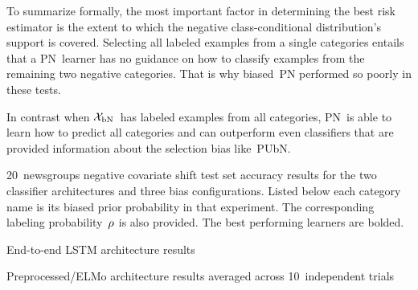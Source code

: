 To summarize formally, the most important factor in determining the best risk estimator is the extent to which the negative class-conditional distribution's support is covered.  Selecting all labeled examples from a single categories entails that a PN~learner has no guidance on how to classify examples from the remaining two negative categories.  That is why biased~PN performed so poorly in these tests.

In contrast when $\mathcal{X}_{\textnormal{bN}}$~has labeled examples from all categories, PN~is able to learn how to predict all categories and can outperform even classifiers that are provided information about the selection bias like~PUbN.

\begin{table}[t]
  \caption{20~newsgroups negative covariate shift test set accuracy results for the two classifier architectures and three bias configurations. Listed below each category name is its biased prior probability in that experiment. The corresponding labeling probability~$\rho$ is also provided. The best performing learners are bolded.}\label{tab:ExperimentalResults}
  \begin{subtable}[t]{\textwidth}
    \centering
    \caption{End-to-end LSTM architecture results}\label{tab:ExperimentalResults:LSTM}
    
  \end{subtable}

  \begin{subtable}[t]{\textwidth}
    \centering
    \caption{Preprocessed\-/ELMo architecture results averaged across 10~independent trials}\label{tab:ExperimentalResults:ELMo}
    
  \end{subtable}
\end{table}
